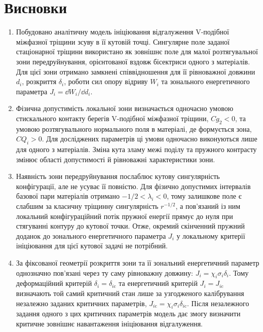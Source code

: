 \section{Висновки}
\label{sec:conclusions}

\begin{enumerate}
\item
Побудовано аналітичну модель ініціювання відгалуження V-подібної
міжфазної тріщини зсуву в її кутовій точці. Сингулярне поле заданої
стаціонарної тріщини використано як зовнішнє поле для малої
розтягувальної зони передруйнування, орієнтованої вздовж бісектриси
одного з матеріалів. Для цієї зони отримано замкнені співвідношення для
її рівноважної довжини $d_i$, розкриття $\delta_i$, роботи сил опору
відриву $W_i$ та зонального енергетичного параметра
$J_i=\dd W_i/\dd d_i$.

\item
Фізична допустимість локальної зони визначається одночасно умовою
стискального контакту берегів V-подібної міжфазної тріщини,
$Cg_2<0$, та умовою розтягувального нормального поля в матеріалі, де
формується зона, $CQ_i>0$. Для досліджених параметрів ці умови одночасно
виконуються лише для одного з матеріалів. Зміна кута зламу межі поділу
та пружного контрасту змінює області допустимості й рівноважні
характеристики зони.

\item
Наявність зони передруйнування послаблює кутову сингулярність
конфігурації, але не усуває її повністю. Для фізично допустимих інтервалів базової пари
матеріалів отримано $-1/2<\lambda_i<0$, тому залишкове поле є слабшим
за класичну тріщинну сингулярність $r^{-1/2}$, а пов'язаний із ним
локальний конфігураційний потік пружної енергії прямує до нуля при
стягуванні контуру до кутової точки. Отже, окремий скінченний пружний
доданок до зонального енергетичного параметра $J_i$ у локальному
критерії ініціювання для цієї кутової задачі не потрібний.

\item
За фіксованої геометрії розкриття зони та її зональний енергетичний
параметр однозначно пов'язані через ту саму рівноважну довжину:
$J_i=\chi_i\sigma_i\delta_i$. Тому деформаційний критерій
$\delta_i=\delta_{i\mathrm{c}}$ та енергетичний критерій
$J_i=J_{i\mathrm{c}}$ визначають той самий критичний стан лише за
узгодженого калібрування незалежно заданих критичних параметрів,
$J_{i\mathrm{c}}=\chi_i\sigma_i\delta_{i\mathrm{c}}$. Після
незалежного задання одного з цих критичних параметрів модель дає змогу
визначити критичне зовнішнє навантаження ініціювання відгалуження.


\end{enumerate}
